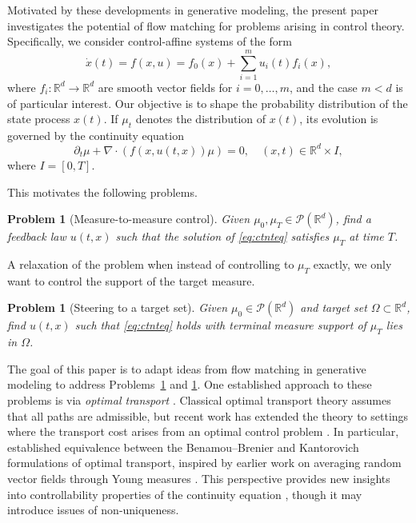 \documentclass{article}
\newtheorem{problem}[theorem]{Problem}
\begin{document}
Motivated by these developments in generative modeling, the present paper investigates the potential of flow matching for problems arising in control theory. Specifically, we consider control-affine systems of the form
\begin{equation}
\dot{x}(t) = f(x,u) = f_0(x) + \sum_{i=1}^m u_i(t) f_i(x),
\label{eq:ctrsys}
\end{equation}
where $f_i:\mathbb{R}^d \to \mathbb{R}^d$ are smooth vector fields for $i=0,\dots,m$, and the case $m<d$ is of particular interest. Our objective is to shape the probability distribution of the state process $x(t)$. If $\mu_t$ denotes the distribution of $x(t)$, its evolution is governed by the continuity equation
\begin{equation}
\partial_t \mu + \nabla \cdot \left( f(x,u(t,x)) \mu \right) = 0,
\quad (x,t)\in \mathbb{R}^d \times I,
\label{eq:ctnteq}
\end{equation}
where $I=[0,T]$.

This motivates the following problems.

\begin{problem}[Measure-to-measure control]
\label{prb1}
Given $\mu_0, \mu_T \in \mathcal{P}(\mathbb{R}^d)$, find a feedback law $u(t,x)$ such that the solution of \eqref{eq:ctnteq} satisfies $\mu_T$ at time $T$.
\end{problem}

A relaxation of the problem when instead of controlling to $\mu_T$ exactly, we only want to control the support of the target measure.

\begin{problem}[Steering to a target set]
\label{prb2}
Given $\mu_0\in\mathcal{P}(\mathbb{R}^d)$ and target set $\Omega \subset \mathbb{R}^d$, find $u(t,x)$ such that \eqref{eq:ctnteq} holds with terminal measure support of $\mu_T$ lies in $\Omega$.
\end{problem}


The goal of this paper is to adapt ideas from flow matching in generative modeling \cite{lipmanflow,liu2022flow,albergo2023stochastic} to address Problems~\ref{prb1} and \ref{prb2}. One established approach to these problems is via \emph{optimal transport} \cite{villani2008optimal,santambrogio2015optimal}. Classical optimal transport theory assumes that all paths are admissible, but recent work has extended the theory to settings where the transport cost arises from an optimal control problem \cite{agrachev2009optimal,figalli2010mass,hindawi2011mass,chen2016optimal,elamvazhuthi2025optimal,elamvazhuthi2024benamou,einav2025equivalence,citti2025benamou}. In particular, \cite{elamvazhuthi2024benamou} established equivalence between the Benamou–Brenier and Kantorovich formulations of optimal transport, inspired by earlier work on averaging random vector fields through Young measures \cite{lisini2006absolutely,bernard2008young}. This perspective provides new insights into controllability properties of the continuity equation \cite{arguillere2017sub,duprez2019approximate}, though it may introduce issues of non-uniqueness.
\end{document}
